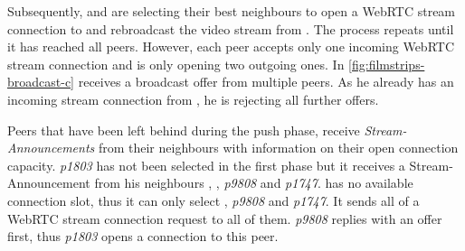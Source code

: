 Subsequently, \alice and \bob are selecting their best neighbours to open a WebRTC stream connection to and rebroadcast the video stream from \claire. The process repeats until it has reached all peers. However, each peer accepts only one incoming WebRTC stream connection and is only opening two outgoing ones.
In \vref{fig:filmstrips-broadcast-c} \don receives a broadcast offer from multiple peers. As he already has an incoming stream connection from \alice, he is rejecting all further offers.

Peers that have been left behind during the push phase, receive \textit{Stream-Announcements} from their neighbours with information on their open connection capacity. \textit{p1803} has not been selected in the first phase but it receives a Stream-Announcement from his neighbours \claire, \don, \textit{p9808} and \textit{p1747}. \claire has no available connection slot, thus it can only select \don, \textit{p9808} and \textit{p1747}. It sends all of a WebRTC stream connection request to all of them. \textit{p9808} replies with an offer first, thus \textit{p1803} opens a connection to this peer.
